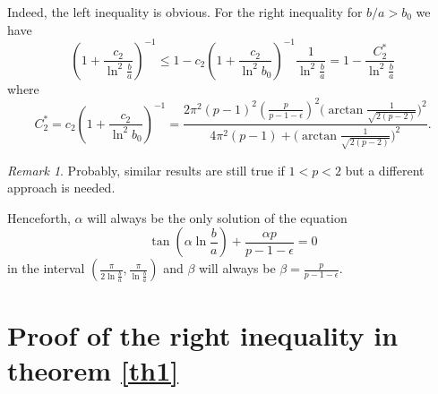 \documentclass{amsart}
\theoremstyle{definition}
\theoremstyle{remark}
\newtheorem{remark}[theorem]{Remark}
\numberwithin{equation}{section}
\begin{document}
Indeed, the left inequality is obvious. For the right inequality  for 
$b/a>b_0$ we have
\[
 \left(1+\frac{c_2}{\ln^2 \frac{b}{a}}\right)^{-1}
 \le 1-c_2 \left(1+\frac{c_2}{\ln^2 b_0}\right)^{-1}
 \frac{1}{\ln^2 \frac{b}{a}}=1 -\frac{C_2^*}{\ln^2 \frac{b}{a}}
\]
where
\[
C_2^* = c_2 \left(1+\frac{c_2}{\ln^2 b_0}\right)^{-1}=
\frac{2\pi^2(p-1)^2 \left(\frac{p}{p-1-\epsilon}\right)^2
\Big( \arctan{\frac{1}{\sqrt{2(p-2)}} }\Big)^2}{4\pi^2(p-1)+\Big( \arctan{\frac{1}{\sqrt{2(p-2)}} }\Big)^2}.
\]










\begin{remark}
Probably, similar results are still true if $1<p<2$ but a different approach is needed.
\end{remark}



Henceforth, $\alpha$ will always be the only solution of the equation
\[
\tan\left(\alpha\ln \frac{b}{a} \right)+\frac{\alpha p}{p-1-\epsilon}=0
\]
in the interval $\left(\frac{\pi}{2\ln \frac{b}{a}},\frac{\pi}{\ln \frac{b}{a}} \right)$ and $\beta$ will always be $\beta =\frac{p}{p-1-\epsilon}$.


 
\section{Proof of the right inequality in theorem \ref{th1}}
\end{document}

